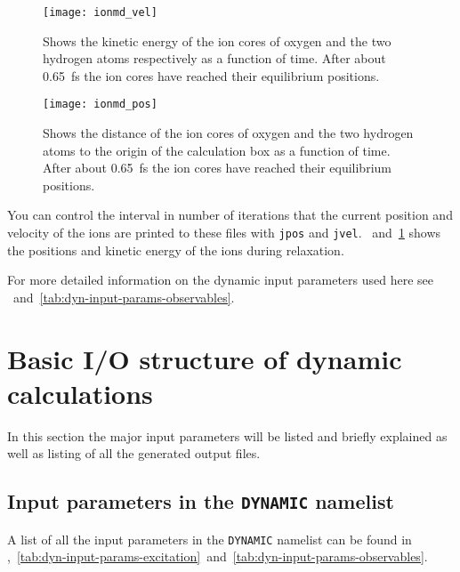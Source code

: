 \documentclass[11pt,a4paper]{article}
\begin{document}
			\begin{figure}[t]%
				\centering
				\texttt{[image: ionmd\_vel]}
				\caption{Shows the kinetic energy of the ion cores of oxygen and the two hydrogen atoms respectively as a function of time. After about 0.65~fs the ion cores have reached their equilibrium positions.}\label{fig:ionmd-vel}
			\end{figure}

			\begin{figure}[t]%
				\centering
				\texttt{[image: ionmd\_pos]}
				\caption{Shows the distance of the ion cores of oxygen and the two hydrogen atoms to the origin of the calculation box as a function of time. After about 0.65~fs the ion cores have reached their equilibrium positions.}\label{fig:ionmd-pos}
			\end{figure}
			
			You can control the interval in number of iterations that the current position and velocity of the ions are printed to these files with \texttt{jpos} and \texttt{jvel}. ~and~\ref{fig:ionmd-vel} shows the positions and kinetic energy of the ions during relaxation.
			
			For more detailed information on the dynamic input parameters used here see ~and~\ref{tab:dyn-input-params-observables}.

	\section{Basic I/O structure of dynamic calculations}
		In this section the major input parameters will be listed and briefly explained as well as listing of all the generated output files. 
		
		\subsection{Input parameters in the \texttt{DYNAMIC} namelist}
			A list of all the input parameters in the \texttt{DYNAMIC} namelist can be found in ,~\ref{tab:dyn-input-params-excitation}~and~\ref{tab:dyn-input-params-observables}.
			
\end{document}
